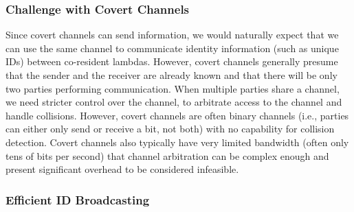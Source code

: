 \subsubsection{Challenge with Covert Channels}
Since covert channels can send information, we would naturally expect that we
can use the same channel to communicate identity information (such as unique
IDs) between co-resident lambdas. However, covert channels generally presume
that the sender and the receiver are already known and that there will be only
two parties performing communication. When multiple parties share a channel, we
need stricter control over the channel, to arbitrate access to the channel and
handle collisions.  However, covert channels are often binary channels (i.e.,
parties can either only send or receive a bit, not both) with no capability for
collision detection. Covert channels also typically have very limited bandwidth
(often only tens of bits per second) that channel arbitration can be complex
enough and present significant overhead to be considered infeasible.



%

\subsubsection{Efficient ID Broadcasting}
\label{sec:method:protocol}


